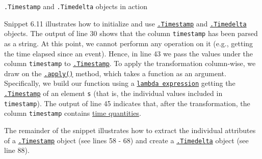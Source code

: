 \documentclass[a4paper,11pt]{book}
\numberwithin{figure}{chapter}
\numberwithin{table}{chapter}
\newcommand{\question}[1]{%
    \begin{tcolorbox}[colback=comp_c!10,colframe=comp_c,sidebyside align=top,width=\linewidth,before skip=1ex]
        #1
    \end{tcolorbox}
    \switchcolumn%
}
\newcommand{\note}[1]{%
    \begin{tcolorbox}[colback=white!0,colframe=white!10,width=\linewidth,before skip=1ex]
        #1
    \end{tcolorbox}
}
\begin{document}
\begin{paracol}{2}
	\question{\raggedright \texttt{.Timestamp} and \texttt{.Timedelta} objects in action}
	\note{Snippet 6.11 illustrates how to initialize and use \href{https://pandas.pydata.org/docs/reference/api/pandas.Timestamp.html}{\texttt{.Timestamp}} and \href{https://pandas.pydata.org/docs/reference/api/pandas.Timedelta.html}{\texttt{.Timedelta}} objects. The output of line 30 shows that the column \texttt{timestamp} has been parsed as a string. At this point, we cannot performn any operation on it (e.g., getting the time elapsed since an event). Hence, in line 43 we pass the values under the column \texttt{timestamp} to \href{https://pandas.pydata.org/docs/reference/api/pandas.Timestamp.html}{\texttt{.Timestamp}}. To apply the transformation column-wise, we draw on the \href{https://pandas.pydata.org/docs/reference/api/pandas.DataFrame.apply.html}{\texttt{.apply()}} method, which takes a function as an argument. Specifically, we build our function using a \href{https://docs.python.org/3/tutorial/controlflow.html}{\texttt{lambda expression}} getting the \href{https://pandas.pydata.org/docs/reference/api/pandas.Timestamp.html}{\texttt{.Timestamp}} of an element \texttt{s} (that is, the individual values included in \texttt{timestamp}). The output of line 45 indicates that, after the transformation, the column \texttt{timestamp} contains \href{https://docs.python.org/3/library/datetime.html}{time quantities}.
	
	\quad The remainder of the snippet illustrates how to extract the individual attributes of a \href{https://pandas.pydata.org/docs/reference/api/pandas.Timestamp.html}{\texttt{.Timestamp}} object (see lines 58 - 68) and create a \href{https://pandas.pydata.org/docs/reference/api/pandas.Timedelta.html}{\texttt{.Timedelta}} object (see line 88).
	}
\end{paracol}
\clearpage
\end{document}
